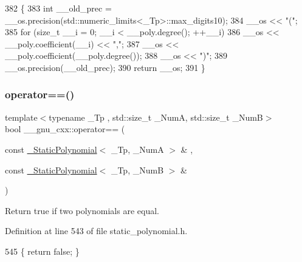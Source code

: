 \begin{DoxyCode}
382     \{
383       \textcolor{keywordtype}{int} \_\_old\_prec = \_\_os.precision(std::numeric\_limits<\_Tp>::max\_digits10);
384       \_\_os << \textcolor{stringliteral}{"("};
385       \textcolor{keywordflow}{for} (\textcolor{keywordtype}{size\_t} \_\_i = 0; \_\_i < \_\_poly.degree(); ++\_\_i)
386         \_\_os << \_\_poly.coefficient(\_\_i) << \textcolor{stringliteral}{","};
387       \_\_os << \_\_poly.coefficient(\_\_poly.degree());
388       \_\_os << \textcolor{stringliteral}{")"};
389       \_\_os.precision(\_\_old\_prec);
390       \textcolor{keywordflow}{return} \_\_os;
391     \}
\end{DoxyCode}
\mbox{\label{namespace____gnu__cxx_a85c9740061a6497bb695d2ee147f52b8}} 
\subsubsection{\texorpdfstring{operator==()}{operator==()}\hspace{0.1cm}{\footnotesize\ttfamily [1/3]}}
{\footnotesize\ttfamily template$<$typename \+\_\+\+Tp , std\+::size\+\_\+t \+\_\+\+NumA, std\+::size\+\_\+t \+\_\+\+NumB$>$ \\
bool \+\_\+\+\_\+gnu\+\_\+cxx\+::operator== (\begin{DoxyParamCaption}\item[{const \hyperlink{class____gnu__cxx_1_1__StaticPolynomial}{\+\_\+\+Static\+Polynomial}$<$ \+\_\+\+Tp, \+\_\+\+NumA $>$ \&}]{,  }\item[{const \hyperlink{class____gnu__cxx_1_1__StaticPolynomial}{\+\_\+\+Static\+Polynomial}$<$ \+\_\+\+Tp, \+\_\+\+NumB $>$ \&}]{ }\end{DoxyParamCaption})\hspace{0.3cm}{\ttfamily [inline]}}

Return true if two polynomials are equal. 

Definition at line 543 of file static\+\_\+polynomial.\+h.


\begin{DoxyCode}
545     \{ \textcolor{keywordflow}{return} \textcolor{keyword}{false}; \}
\end{DoxyCode}
\mbox{\label{namespace____gnu__cxx_a2d1430ebbbaf156a6c80a8e8107960e1}} 
